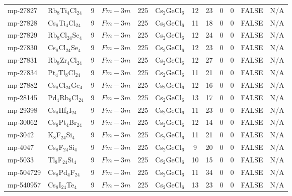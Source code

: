 {\begin{longtable}{llcccccccccc}
    mp-27827 & Rb$_{8}$Ti$_{4}$Cl$_{24}$ & 9     & $Fm-3m$ & 225   & Cs$_{2}$GeCl$_{6}$ & 12    & 23    & 0     & 0     & FALSE & N/A \\
    mp-27828 & Cs$_{8}$Ti$_{4}$Cl$_{24}$ & 9     & $Fm-3m$ & 225   & Cs$_{2}$GeCl$_{6}$ & 11    & 18    & 0     & 0     & FALSE & N/A \\
    mp-27829 & Rb$_{8}$Cl$_{24}$Se$_{4}$ & 9     & $Fm-3m$ & 225   & Cs$_{2}$GeCl$_{6}$ & 12    & 24    & 0     & 0     & FALSE & N/A \\
    mp-27830 & Cs$_{8}$Cl$_{24}$Se$_{4}$ & 9     & $Fm-3m$ & 225   & Cs$_{2}$GeCl$_{6}$ & 12    & 23    & 0     & 0     & FALSE & N/A \\
    mp-27831 & Rb$_{8}$Zr$_{4}$Cl$_{24}$ & 9     & $Fm-3m$ & 225   & Cs$_{2}$GeCl$_{6}$ & 12    & 27    & 0     & 0     & FALSE & N/A \\
    mp-27834 & Pt$_{4}$Tl$_{8}$Cl$_{24}$ & 9     & $Fm-3m$ & 225   & Cs$_{2}$GeCl$_{6}$ & 11    & 21    & 0     & 0     & FALSE & N/A \\
    mp-27882 & Cs$_{8}$Cl$_{24}$Ge$_{4}$ & 9     & $Fm-3m$ & 225   & Cs$_{2}$GeCl$_{6}$ & 12    & 16    & 0     & 0     & FALSE & N/A \\
    mp-28145 & Pd$_{4}$Rb$_{8}$Cl$_{24}$ & 9     & $Fm-3m$ & 225   & Cs$_{2}$GeCl$_{6}$ & 13    & 17    & 0     & 0     & FALSE & N/A \\
    mp-29398 & Cs$_{8}$Hf$_{4}$I$_{24}$ & 9     & $Fm-3m$ & 225   & Cs$_{2}$GeCl$_{6}$ & 11    & 23    & 0     & 0     & FALSE & N/A \\
    mp-30062 & Cs$_{8}$Pt$_{4}$Br$_{24}$ & 9     & $Fm-3m$ & 225   & Cs$_{2}$GeCl$_{6}$ & 12    & 14    & 0     & 0     & FALSE & N/A \\
    mp-3042 & K$_{8}$F$_{24}$Si$_{4}$ & 9     & $Fm-3m$ & 225   & Cs$_{2}$GeCl$_{6}$ & 11    & 21    & 0     & 0     & FALSE & N/A \\
    mp-4047 & Cs$_{8}$F$_{24}$Si$_{4}$ & 9     & $Fm-3m$ & 225   & Cs$_{2}$GeCl$_{6}$ & 9     & 20    & 0     & 0     & FALSE & N/A \\
    mp-5033 & Tl$_{8}$F$_{24}$Si$_{4}$ & 9     & $Fm-3m$ & 225   & Cs$_{2}$GeCl$_{6}$ & 10    & 15    & 0     & 0     & FALSE & N/A \\
    mp-504729 & Cs$_{8}$Pd$_{4}$F$_{24}$ & 9     & $Fm-3m$ & 225   & Cs$_{2}$GeCl$_{6}$ & 11    & 34    & 0     & 0     & FALSE & N/A \\
    mp-540957 & Cs$_{8}$I$_{24}$Te$_{4}$ & 9     & $Fm-3m$ & 225   & Cs$_{2}$GeCl$_{6}$ & 13    & 23    & 0     & 0     & FALSE & N/A \\

\end{longtable}}
